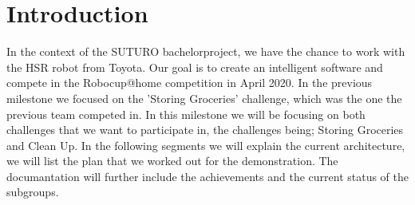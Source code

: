 \documentclass[main.tex]{subfiles}
\begin{document}
	\chapter{Introduction}
	In the context of the SUTURO bachelorproject, we have the chance to work with the HSR robot from Toyota. Our goal is to create an intelligent software and compete in the Robocup@home competition in April 2020. 
	In the previous milestone we focused on the 'Storing Groceries' challenge, which was the one the previous team competed in. In this milestone we will be focusing on both challenges that we want to participate in, the challenges being; Storing Groceries and Clean Up. 
	In the following segments we will explain the current architecture, we will list the plan that we worked out for the demonstration. The documantation will further include the achievements and the current status of the subgroups.
\end{document}
